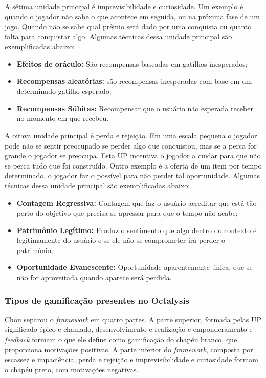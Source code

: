 A sétima unidade principal é imprevisibilidade e curiosidade. Um exemplo é quando o jogador não sabe o que acontece em seguida, ou na próxima fase de um jogo. Quando não se sabe qual prêmio será dado por uma conquista ou quanto falta para conquistar algo. Algumas técnicas dessa unidade principal são exemplificadas abaixo:

\begin{itemize}
\item  \textbf{Efeitos de oráculo:} São recompensas baseadas em gatilhos inesperados;
\item  \textbf{Recompensas aleatórias:} são recompensas inesperadas com base em um determinado gatilho esperado;
\item  \textbf{Recompensas Súbitas:} Recompensar que o usuário não esperada receber no momento em que recebeu.
\end{itemize}

A oitava unidade principal é perda e rejeição. Em uma escala pequena o jogador pode não se sentir preocupado se perder algo que conquistou, mas se a perca for grande o jogador se preocupa. Esta UP incentiva o jogador a cuidar para que não se perca tudo que foi construído. Outro exemplo é a oferta de um item por tempo determinado, o jogador faz o possível para não perder tal oportunidade. Algumas técnicas dessa unidade principal são exemplificadas abaixo:

\begin{itemize}
\item  \textbf{Contagem Regressiva:} Contagem que faz o usuário acreditar que está tão perto do objetivo que precisa se apressar para que o tempo não acabe;
\item  \textbf{Patrimônio Legítimo:} Produz o sentimento que algo dentro do contexto é legitimamente do usuário e se ele não se comprometer irá perder o patrimônio;
\item  \textbf{Oportunidade Evanescente:} Oportunidade aparentemente única, que se não for aproveitada quando aparece será perdida.
\end{itemize}

\subsubsection{Tipos de gamificação presentes no Octalysis}

Chou separou o \textit{framework} em quatro partes. A parte superior, formada pelas UP significado épico e chamado, desenvolvimento e realização e emponderamento e \textit{feedback} formam o que ele define como gamificação do chapéu branco, que proporciona motivações positivas. A parte inferior do \textit{framework}, composta por escassez e impaciência, perda e rejeição e imprevisibilidade e curiosidade formam o chapéu preto, com motivações negativas. 


